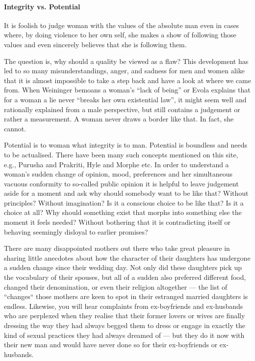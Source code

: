\paragraph{Integrity vs. Potential}
\begin{quotex}
It is foolish to judge woman with the values of the absolute man even in cases where, by doing violence to her own self, she makes a show of following those values and even sincerely believes that she is following them. 

\end{quotex}
The question is, why should a quality be viewed as a flaw? This development has led to so many misunderstandings, anger, and sadness for men and women alike that it is almost impossible to take a step back and have a look at where we came from. When Weininger bemoans a woman's “lack of being” or Evola explains that for a woman a lie never “breaks her own existential law”, it might seem well and rationally explained from a male perspective, but still contains a judgement or rather a measurement. A woman never draws a border like that. In fact, she cannot.

Potential is to woman what integrity is to man. Potential is boundless and needs to be actualised. There have been many such concepts mentioned on this site, e.g., Purusha and Prakriti, Hyle and Morphe etc. In order to understand a woman's sudden change of opinion, mood, preferences and her simultaneous vacuous conformity to so-called public opinion it is helpful to leave judgement aside for a moment and ask why should somebody want to be like that? Without principles? Without imagination? Is it a conscious choice to be like that? Is it a choice at all? Why should something exist that morphs into something else the moment it feels needed? Without bothering that it is contradicting itself or behaving seemingly disloyal to earlier promises?

There are many disappointed mothers out there who take great pleasure in sharing little anecdotes about how the character of their daughters has undergone a sudden change since their wedding day. Not only did these daughters pick up the vocabulary of their spouses, but all of a sudden also preferred different food, changed their denomination, or even their religion altogether — the list of “changes“ those mothers are keen to spot in their estranged married daughters is endless. Likewise, you will hear complaints from ex-boyfriends and ex-husbands who are perplexed when they realise that their former lovers or wives are finally dressing the way they had always begged them to dress or engage in exactly the kind of sexual practices they had always dreamed of — but they do it now with their new man and would have never done so for their ex-boyfriends or ex-husbands.

